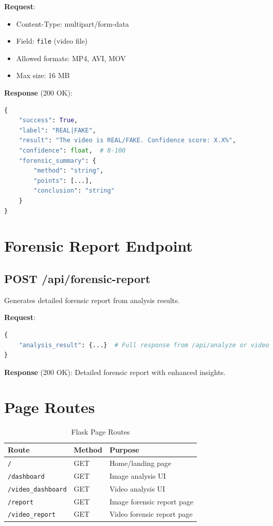 \documentclass[12pt,a4paper]{book}
\begin{document}
\begin{itemize}
\textbf{Request}:
\begin{itemize}
    \item Content-Type: multipart/form-data
    \item Field: \texttt{file} (video file)
    \item Allowed formats: MP4, AVI, MOV
    \item Max size: 16 MB
\end{itemize}

\textbf{Response} (200 OK):

\begin{lstlisting}[language=Python]
{
    "success": True,
    "label": "REAL|FAKE",
    "result": "The video is REAL/FAKE. Confidence score: X.X%",
    "confidence": float,  # 0-100
    "forensic_summary": {
        "method": "string",
        "points": [...],
        "conclusion": "string"
    }
}
\end{lstlisting}

\section{Forensic Report Endpoint}

\subsection{POST /api/forensic-report}

Generates detailed forensic report from analysis results.

\textbf{Request}:

\begin{lstlisting}[language=Python]
{
    "analysis_result": {...}  # Full response from /api/analyze or video
}
\end{lstlisting}

\textbf{Response} (200 OK): Detailed forensic report with enhanced insights.

\section{Page Routes}

\begin{table}[H]
\centering
\captionsetup{justification=centering}
\caption{Flask Page Routes}
\begin{tabular}{|l|l|p{4cm}|}
\hline
\textbf{Route} & \textbf{Method} & \textbf{Purpose} \\
\hline
\texttt{/} & GET & Home/landing page \\
\hline
\texttt{/dashboard} & GET & Image analysis UI \\
\hline
\texttt{/video\_dashboard} & GET & Video analysis UI \\
\hline
\texttt{/report} & GET & Image forensic report page \\
\hline
\texttt{/video\_report} & GET & Video forensic report page \\
\hline
\end{tabular}
\end{table}


\end{itemize}
\end{document}
